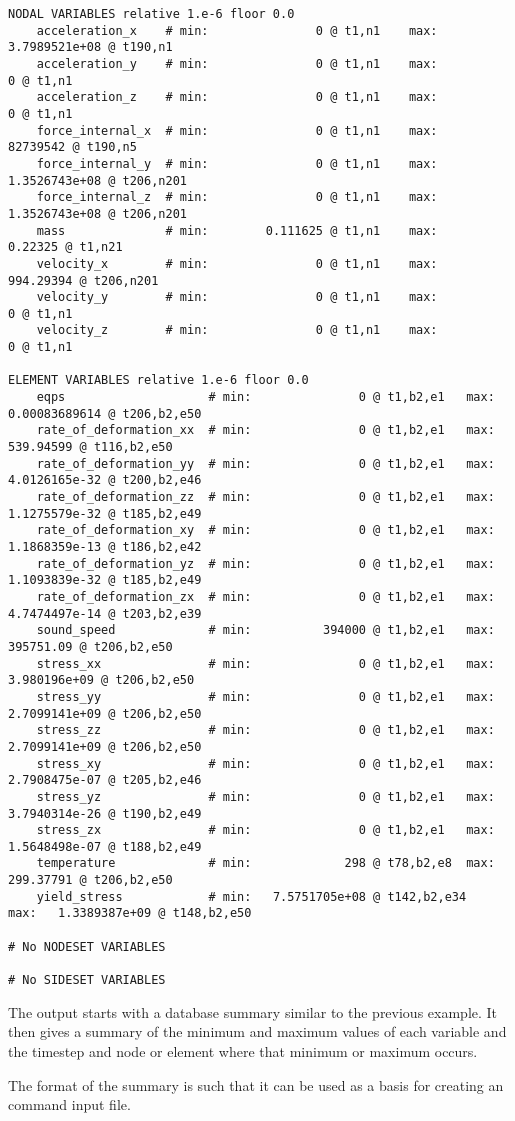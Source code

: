 \begin{verbatim}
NODAL VARIABLES relative 1.e-6 floor 0.0
	acceleration_x    # min:               0 @ t1,n1	max:   3.7989521e+08 @ t190,n1
	acceleration_y    # min:               0 @ t1,n1	max:               0 @ t1,n1
	acceleration_z    # min:               0 @ t1,n1	max:               0 @ t1,n1
	force_internal_x  # min:               0 @ t1,n1	max:        82739542 @ t190,n5
	force_internal_y  # min:               0 @ t1,n1	max:   1.3526743e+08 @ t206,n201
	force_internal_z  # min:               0 @ t1,n1	max:   1.3526743e+08 @ t206,n201
	mass              # min:        0.111625 @ t1,n1	max:         0.22325 @ t1,n21
	velocity_x        # min:               0 @ t1,n1	max:       994.29394 @ t206,n201
	velocity_y        # min:               0 @ t1,n1	max:               0 @ t1,n1
	velocity_z        # min:               0 @ t1,n1	max:               0 @ t1,n1

ELEMENT VARIABLES relative 1.e-6 floor 0.0
	eqps                    # min:               0 @ t1,b2,e1	max:   0.00083689614 @ t206,b2,e50
	rate_of_deformation_xx  # min:               0 @ t1,b2,e1	max:       539.94599 @ t116,b2,e50
	rate_of_deformation_yy  # min:               0 @ t1,b2,e1	max:   4.0126165e-32 @ t200,b2,e46
	rate_of_deformation_zz  # min:               0 @ t1,b2,e1	max:   1.1275579e-32 @ t185,b2,e49
	rate_of_deformation_xy  # min:               0 @ t1,b2,e1	max:   1.1868359e-13 @ t186,b2,e42
	rate_of_deformation_yz  # min:               0 @ t1,b2,e1	max:   1.1093839e-32 @ t185,b2,e49
	rate_of_deformation_zx  # min:               0 @ t1,b2,e1	max:   4.7474497e-14 @ t203,b2,e39
	sound_speed             # min:          394000 @ t1,b2,e1	max:       395751.09 @ t206,b2,e50
	stress_xx               # min:               0 @ t1,b2,e1	max:    3.980196e+09 @ t206,b2,e50
	stress_yy               # min:               0 @ t1,b2,e1	max:   2.7099141e+09 @ t206,b2,e50
	stress_zz               # min:               0 @ t1,b2,e1	max:   2.7099141e+09 @ t206,b2,e50
	stress_xy               # min:               0 @ t1,b2,e1	max:   2.7908475e-07 @ t205,b2,e46
	stress_yz               # min:               0 @ t1,b2,e1	max:   3.7940314e-26 @ t190,b2,e49
	stress_zx               # min:               0 @ t1,b2,e1	max:   1.5648498e-07 @ t188,b2,e49
	temperature             # min:             298 @ t78,b2,e8	max:       299.37791 @ t206,b2,e50
	yield_stress            # min:   7.5751705e+08 @ t142,b2,e34	max:   1.3389387e+09 @ t148,b2,e50

# No NODESET VARIABLES

# No SIDESET VARIABLES
\end{verbatim}
\sectionline
The output starts with a database summary similar to the previous
example.  It then gives a summary of the minimum and maximum values of
each variable and the timestep and node or element where that minimum
or maximum occurs.

The format of the summary is such that it can be used as a basis for
creating an \exodiff{} command input file.
